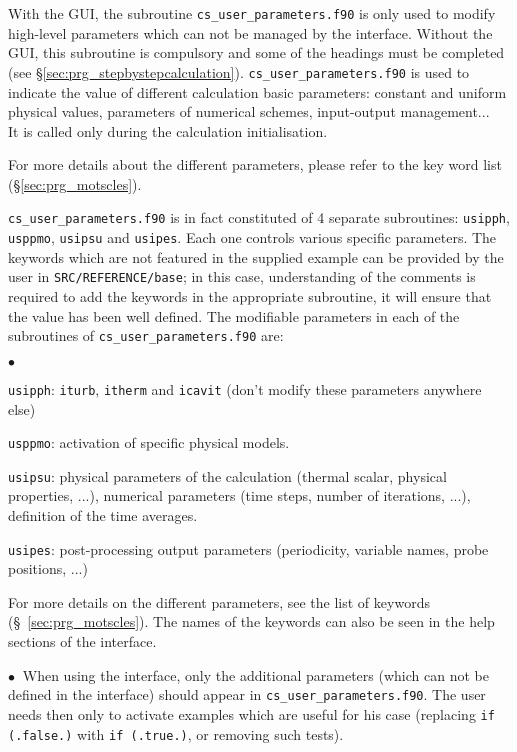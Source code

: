 {{{With the GUI, the subroutine \texttt{cs\_user\_parameters.f90} is only
used to modify high-level parameters which can not be managed by the
interface. Without the GUI, this
subroutine is compulsory and some of the headings must be completed (see \S\ref{sec:prg_stepbystepcalculation}).
\texttt{cs\_user\_parameters.f90}
is used to indicate the value of different calculation
basic parameters: constant and uniform physical values, parameters of
numerical schemes, input-output management...\\
It is called only during the calculation initialisation.

For more details about the different parameters, please refer to the key
word list (\S\ref{sec:prg_motscles}).

\texttt{cs\_user\_parameters.f90} is in fact constituted of 4 separate subroutines:  \texttt{usipph}, \texttt{usppmo},
\texttt{usipsu} and \texttt{usipes}. Each one controls various
 specific parameters. The keywords which are not featured in the supplied example
can be provided by the user in \texttt{SRC/REFERENCE/base}; in this case,
understanding of the comments is required to add the keywords in the appropriate
subroutine, it will ensure that the value
has been well defined. The modifiable parameters in each of the subroutines of
\texttt{cs\_user\_parameters.f90} are:

\begin{list}{$\bullet$}{}
\item \texttt{usipph}: \texttt{iturb}, \texttt{itherm} and \texttt{icavit} (don't modify these
      parameters anywhere else)
\item \texttt{usppmo}: activation of specific physical models.
\item \texttt{usipsu}: physical parameters of the calculation (thermal scalar, physical
      properties, ...), numerical parameters (time steps, number of iterations, ...),
      definition of the time averages.
\item \texttt{usipes}: post-processing output parameters (periodicity, variable names,
      probe positions, ...)
\end{list}

For more details on the different parameters, see the list of keywords
(\S~\ref{sec:prg_motscles}).
 The names of the keywords can also be seen in the help sections of the interface.

\noindent
$\bullet\ $ When using the interface, only the
additional parameters (which can not be defined in the interface)
should appear in \texttt{cs\_user\_parameters.f90}. The user
needs then only to activate examples which are useful for his
case (replacing \texttt{if (.false.)} with \texttt{if (.true.)},
or removing such tests).

}}}
